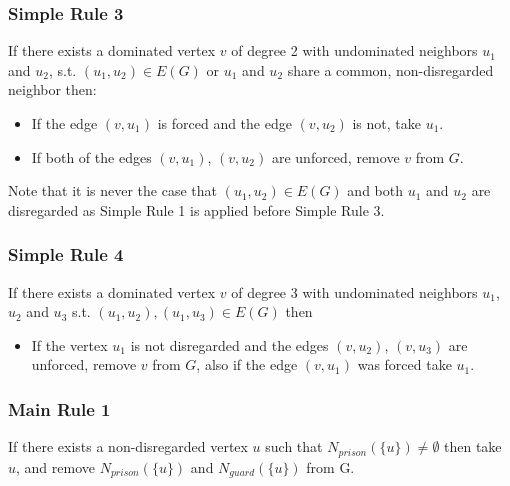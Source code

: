 \documentclass[a4paper,UKenglish,cleveref, autoref, thm-restate]{lipics-v2021}
\begin{document}
\subsubsection{Simple Rule 3}
If there exists a dominated vertex $v$ of degree 2 with undominated neighbors $u_1$ and $u_2$, s.t. $(u_1, u_2) \in E(G)$ or $u_1$ and $u_2$ share a common, non-disregarded neighbor then:
\begin{itemize}
    \item If the edge $(v, u_1)$ is forced and the edge $(v, u_2)$ is not, take $u_1$.
    \item If both of the edges $(v, u_1)$, $(v, u_2)$ are unforced, remove $v$ from $G$.
\end{itemize}

Note that it is never the case that $(u_1, u_2) \in E(G)$ and both $u_1$ and $u_2$ are disregarded as Simple Rule 1 is applied before Simple Rule 3.

\subsubsection{Simple Rule 4}
If there exists a dominated vertex $v$ of degree 3 with undominated neighbors $u_1$, $u_2$ and $u_3$ s.t. $(u_1, u_2), (u_1, u_3) \in E(G)$ then
\begin{itemize}
    \item If the vertex $u_1$ is not disregarded and the edges $(v, u_2)$, $(v, u_3)$ are unforced, remove $v$ from $G$, also if the edge $(v, u_1)$ was forced take $u_1$.
\end{itemize}


\subsubsection{Main Rule 1}
If there exists a non-disregarded vertex $u$ such that $N_{prison}(\{u\}) \neq \emptyset$ then take $u$, and remove $N_{prison}(\{u\})$ and $N_{guard}{(\{u\})}$ from G.
\end{document}
